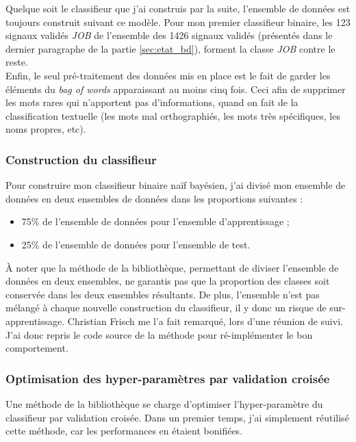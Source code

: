                 Quelque soit le classifieur que j'ai construis par la suite, l'ensemble de données est toujours construit suivant ce modèle. Pour mon premier classifieur binaire, les 123 signaux validés \textit{JOB} de l'ensemble des 1426 signaux validés (présentés dans le dernier paragraphe de la partie \ref{sec:etat_bd}), forment la classe \textit{JOB} contre le reste.\\

                Enfin, le seul pré-traitement des données mis en place est le fait de garder les éléments du \textit{bag of words} apparaissant au moins cinq fois. Ceci afin de supprimer les mots rares qui n'apportent pas d'informations, quand on fait de la classification textuelle (les mots mal orthographiés, les mots très spécifiques, les noms propres, etc).

            \subsubsection{Construction du classifieur}
                Pour construire mon classifieur binaire naïf bayésien, j'ai divisé mon ensemble de données en deux ensembles de données dans les proportions suivantes :
                \begin{itemize}
                    \item 75\% de l'ensemble de données pour l'ensemble d'apprentissage ;
                    \item 25\% de l'ensemble de données pour l'ensemble de test.\\
                \end{itemize}
                À noter que la méthode de la bibliothèque, permettant de diviser l'ensemble de données en deux ensembles, ne garantis pas que la proportion des classes soit conservée dans les deux ensembles résultants. De plus, l'ensemble n'est pas mélangé à chaque nouvelle construction du classifieur, il y donc un risque de sur-apprentissage. Christian Frisch me l'a fait remarqué, lors d'une réunion de suivi. J'ai donc repris le code source de la méthode pour ré-implémenter le bon comportement.

            \subsubsection{Optimisation des hyper-paramètres par validation croisée}
                Une méthode de la bibliothèque se charge d'optimiser l'hyper-paramètre du classifieur par validation croisée. Dans un premier temps, j'ai simplement réutilisé cette méthode, car les performances en étaient bonifiées.

